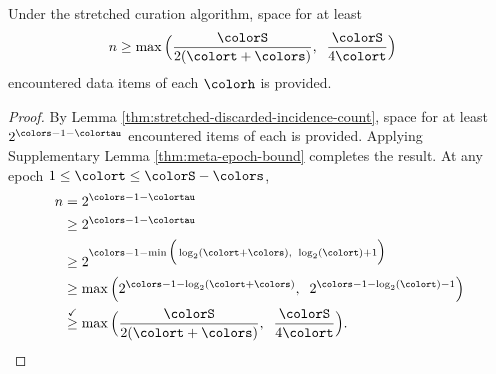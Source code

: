 \begin{corollary}
\label{thm:stretched-reservation-count}
Under the stretched curation algorithm, space for at least
\begin{align*}
n &\geq
\max\Big(
  \frac{\colorS}{2(\colort + \colors)},\;\;
  \frac{\colorS}{4\colort}
\Big)
\end{align*}
encountered data items of each \hv{} $\colorh$ is provided.
\end{corollary}
\begin{proof}

By Lemma \ref{thm:stretched-discarded-incidence-count}, space for at least $2^{\colors - 1 - \colortau}$ encountered items of each \hv{} is provided.
Applying Supplementary Lemma \ref{thm:meta-epoch-bound} completes the result.
At any epoch $1 \leq \colort \leq \colorS - \colors$,
\begin{align*}
n
&= 2^{\colors - 1 - \colortau}\\
&\geq 2^{\colors - 1 - \colortau}\\
&\geq2^{\colors - 1 - \min\Big(
  \log_2(\colort + \colors),\;\;
  \log_2(\colort) + 1
\Big)}\\
&\geq \max\Big(
  2^{\colors - 1 - \log_2(\colort + \colors)},\;\;
  2^{\colors - 1 - \log_2(\colort) - 1}
\Big)\\
&\stackrel{\checkmark}{\geq} \max\Big(
  \frac{\colorS}{2(\colort + \colors)},\;\;
  \frac{\colorS}{4\colort}
\Big).
\end{align*}

\end{proof}
